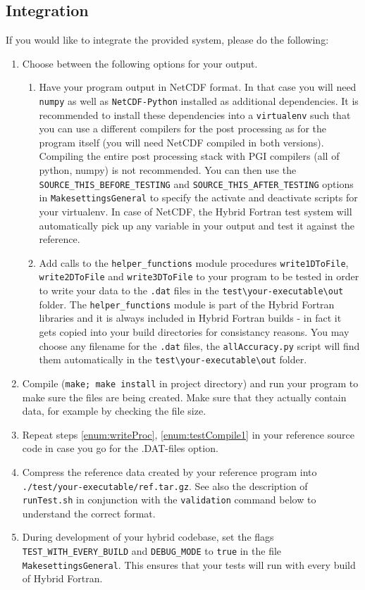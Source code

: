 \subsection{Integration} \label{sub:testIntegration}
If you would like to integrate the provided system, please do the following:
\begin{enumerate}
  \item \label{enum:writeProc} Choose between the following options for your output.
    \begin{enumerate}
      \item Have your program output in NetCDF format. In that case you will need \verb|numpy| as well as \verb|NetCDF-Python| installed as additional dependencies. It is recommended to install these dependencies into a \verb|virtualenv| such that you can use a different compilers for the post processing as for the program itself (you will need NetCDF compiled in both versions). Compiling the entire post processing stack with PGI compilers (all of python, numpy) is not recommended. You can then use the \verb|SOURCE_THIS_BEFORE_TESTING| and \verb|SOURCE_THIS_AFTER_TESTING| options in \verb|MakesettingsGeneral| to specify the activate and deactivate scripts for your virtualenv. In case of NetCDF, the Hybrid Fortran test system will automatically pick up any variable in your output and test it against the reference.
      \item Add calls to the \verb|helper_functions| module procedures \verb|write1DToFile|, \verb|write2DToFile| and \verb|write3DToFile| to your program to be tested in order to write your data to the \verb|.dat| files in the \verb|test\your-executable\out| folder. The \verb|helper_functions| module is part of the Hybrid Fortran libraries and it is always included in Hybrid Fortran builds - in fact it gets copied into your build directories for consistancy reasons. You may choose any filename for the \verb|.dat| files, the \verb|allAccuracy.py| script will find them automatically in the \verb|test\your-executable\out| folder.
    \end{enumerate}
  \item \label{enum:testCompile1} Compile (\verb|make; make install| in project directory) and run your program to make sure the files are being created. Make sure that they actually contain data, for example by checking the file size.
  \item Repeat steps \ref{enum:writeProc}, \ref{enum:testCompile1} in your reference source code in case you go for the .DAT-files option.
  \item Compress the reference data created by your reference program into \linebreak\verb|./test/your-executable/ref.tar.gz|. See also the description of \verb|runTest.sh| in conjunction with the \verb|validation| command below to understand the correct format.
  \item During development of your hybrid codebase, set the flags \verb|TEST_WITH_EVERY_BUILD| and \verb|DEBUG_MODE| to \verb|true| in the file \verb|MakesettingsGeneral|. This ensures that your tests will run with every build of Hybrid Fortran.
\end{enumerate}

